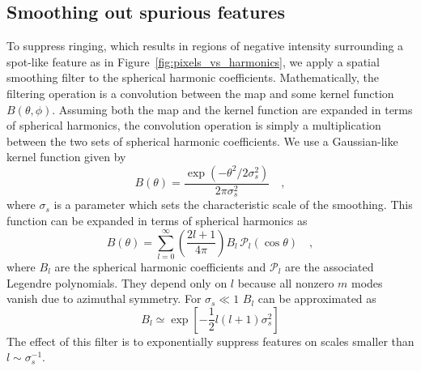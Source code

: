 \documentclass[modern]{aastex62}
\begin{document}
\subsection{Smoothing out spurious features}
\label{ssec:spurious_features}
To suppress ringing, which results in regions of negative intensity surrounding a spot-like feature as in Figure~\ref{fig:pixels_vs_harmonics}, we apply a spatial smoothing filter to the spherical harmonic coefficients.
Mathematically, the filtering operation is a convolution between the map and some kernel function $B(\theta,\phi)$.
Assuming both the map and the kernel function are expanded in terms of spherical harmonics, the convolution operation is simply a multiplication between the two sets of spherical harmonic coefficients.
We use a Gaussian-like kernel function given by
\begin{equation}
    B(\theta)=\frac{\exp \left(-\theta^{2} / 2 \sigma_s^{2}\right)}{2 \pi \sigma_s^{2}}
    \quad,
\end{equation}
where $\sigma_s$ is a parameter which sets the characteristic scale of the smoothing.
This function can be expanded in terms of spherical harmonics as
\begin{equation}
    B(\theta)=\sum_{l=0}^{\infty}\left(\frac{2 l+1}{4 \pi}\right) B_{l} \,\mathcal{P}_{l}(\cos \theta)
    \quad,
\end{equation}
where $B_l$ are the spherical harmonic coefficients and $\mathcal{P}_l$ are the associated Legendre polynomials.
They depend only on $l$ because all nonzero $m$ modes vanish due to azimuthal symmetry.
For $\sigma_s\ll 1$ $B_l$ can be approximated as \citep{seon2007,white1995}
\begin{equation}
    B_l\simeq \exp\left[-\frac{1}{2}l(l+1)\sigma_s^2\right]
\end{equation}
The effect of this filter is to exponentially suppress features on scales smaller than $l\sim \sigma_s^{-1}$.
\end{document}
